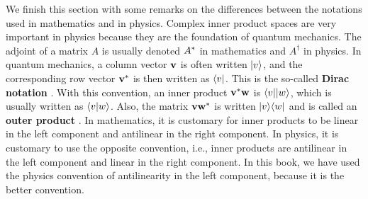 We finish this section with some remarks on the differences between
the notations used in mathematics and in physics. Complex inner
product spaces are very important in physics because they are the
foundation of quantum mechanics. The adjoint of a matrix $A$ is
usually denoted $A^{*}$ in mathematics and $A^{\dagger}$ in
physics. In quantum mechanics, a column vector $\vect{v}$ is often
written $|v\rangle$, and the corresponding row vector
$\vect{v}^{\adjoint}$ is then written as $\langle v|$.  This is the
so-called \textbf{Dirac notation}%
. With this convention, an inner product
$\vect{v}^{\adjoint}\vect{w}$ is $\langle v||w\rangle$, which is usually
written as $\langle v|w\rangle$. Also, the matrix
$\vect{v}\vect{w}^{\adjoint}$ is written $|v\rangle\langle w|$ and is
called an \textbf{outer product}%
%
. In mathematics, it is customary
for inner products to be linear in the left component and antilinear
in the right component. In physics, it is customary to use the
opposite convention, i.e., inner products are antilinear in the left
component and linear in the right component. In this book, we have
used the physics convention of antilinearity in the left component,
because it is the better convention.

